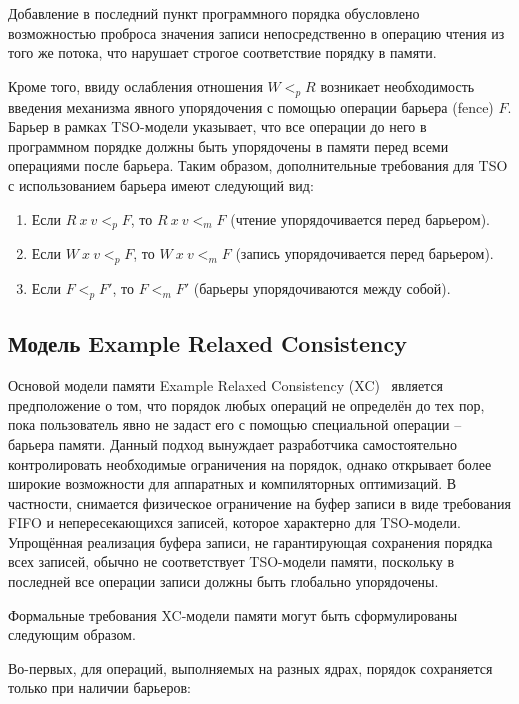 Добавление в последний пункт программного порядка обусловлено
возможностью проброса значения записи непосредственно в операцию
чтения из того же потока, что нарушает строгое соответствие порядку в памяти.

Кроме того, ввиду ослабления отношения $W <_{p} R$ возникает
необходимость введения механизма явного упорядочения с помощью
операции барьера (fence) $F$. Барьер в рамках TSO-модели указывает,
что все операции до него в программном порядке должны быть
упорядочены в памяти перед всеми операциями после барьера. Таким
образом, дополнительные требования для TSO с использованием барьера
имеют следующий вид:

\begin{enumerate}[resume]
  \item Если $R\ x\ v <_{p} F$, то $R\ x\ v <_{m} F$ (чтение
    упорядочивается перед барьером).
  \item Если $W\ x\ v <_{p} F$, то $W\ x\ v <_{m} F$ (запись
    упорядочивается перед барьером).
  \item Если $F <_{p} F'$, то $F <_{m} F'$ (барьеры упорядочиваются
    между собой).
\end{enumerate}

\subsection{Модель Example Relaxed Consistency}
\label{sec:xc}

Основой модели памяти Example Relaxed Consistency (XC)~\cite{xc}
является предположение о том, что порядок любых операций не определён
до тех пор, пока пользователь явно не задаст его с помощью
специальной операции -- барьера памяти. Данный подход вынуждает
разработчика самостоятельно контролировать необходимые ограничения на
порядок, однако открывает более широкие возможности для аппаратных и
компиляторных оптимизаций. В частности, снимается физическое
ограничение на буфер записи в виде требования FIFO и непересекающихся
записей, которое характерно для TSO-модели. Упрощённая реализация
буфера записи, не гарантирующая сохранения порядка всех записей,
обычно не соответствует TSO-модели памяти, поскольку в последней все
операции записи должны быть глобально упорядочены.

Формальные требования XC-модели памяти могут быть сформулированы
следующим образом.

Во-первых, для операций, выполняемых на разных ядрах, порядок
сохраняется только при наличии барьеров:

